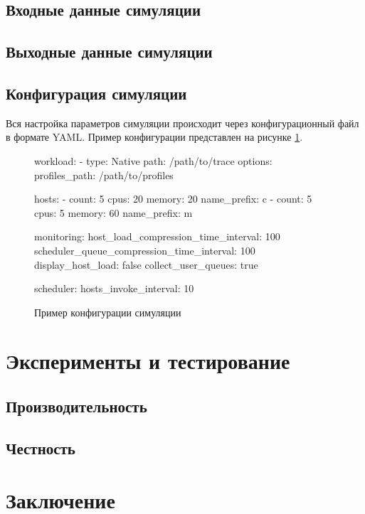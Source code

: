 \subsection{Входные данные симуляции}

\subsection{Выходные данные симуляции}

\subsection{Конфигурация симуляции}

Вся настройка параметров симуляции происходит через конфигурационный файл в формате YAML. Пример конфигурации представлен на рисунке \ref{example-sim-config}. 

\begin{figure}[h!]
    \begin{yamlcode}
workload:
  - type: Native
    path: /path/to/trace
    options: 
      profiles_path: /path/to/profiles

hosts: 
  - count: 5
    cpus: 20
    memory: 20
    name_prefix: c
  - count: 5
    cpus: 5
    memory: 60
    name_prefix: m

monitoring:
  host_load_compression_time_interval: 100
  scheduler_queue_compression_time_interval: 100
  display_host_load: false 
  collect_user_queues: true

scheduler:
  hosts_invoke_interval: 10
\end{yamlcode}
\caption{Пример конфигурации симуляции}
\label{example-sim-config}
\end{figure}


\section{Эксперименты и тестирование}

\subsection{Производительность}

\subsection{Честность}

\section{Заключение}
